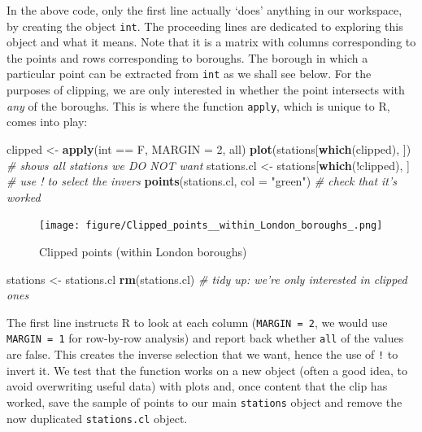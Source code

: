 \documentclass[]{article}
\newenvironment{Shaded}{}{}
\newcommand{\KeywordTok}[1]{\textcolor[rgb]{0.00,0.44,0.13}{\textbf{{#1}}}}
\newcommand{\DataTypeTok}[1]{\textcolor[rgb]{0.56,0.13,0.00}{{#1}}}
\newcommand{\DecValTok}[1]{\textcolor[rgb]{0.25,0.63,0.44}{{#1}}}
\newcommand{\StringTok}[1]{\textcolor[rgb]{0.25,0.44,0.63}{{#1}}}
\newcommand{\CommentTok}[1]{\textcolor[rgb]{0.38,0.63,0.69}{\textit{{#1}}}}
\newcommand{\NormalTok}[1]{{#1}}
\begin{document}
In the above code, only the first line actually `does' anything in our
workspace, by creating the object \texttt{int}. The proceeding lines are
dedicated to exploring this object and what it means. Note that it is a
matrix with columns corresponding to the points and rows corresponding
to boroughs. The borough in which a particular point can be extracted
from \texttt{int} as we shall see below. For the purposes of clipping,
we are only interested in whether the point intersects with \emph{any}
of the boroughs. This is where the function \texttt{apply}, which is
unique to R, comes into play:

\begin{Shaded}
\begin{Highlighting}[]
\NormalTok{clipped <- }\KeywordTok{apply}\NormalTok{(int == F, }\DataTypeTok{MARGIN =} \DecValTok{2}\NormalTok{, all)}
\KeywordTok{plot}\NormalTok{(stations[}\KeywordTok{which}\NormalTok{(clipped), ])  }\CommentTok{# shows all stations we DO NOT want}
\NormalTok{stations.cl <- stations[}\KeywordTok{which}\NormalTok{(!clipped), ]  }\CommentTok{# use ! to select the invers}
\KeywordTok{points}\NormalTok{(stations.cl, }\DataTypeTok{col =} \StringTok{"green"}\NormalTok{)  }\CommentTok{# check that it's worked}
\end{Highlighting}
\end{Shaded}
\begin{figure}[htbp]
\centering
\texttt{[image: figure/Clipped\_points\_\_within\_London\_boroughs\_.png]}
\caption{Clipped points (within London boroughs)}
\end{figure}

\begin{Shaded}
\begin{Highlighting}[]
\NormalTok{stations <- stations.cl}
\KeywordTok{rm}\NormalTok{(stations.cl)  }\CommentTok{# tidy up: we're only interested in clipped ones}
\end{Highlighting}
\end{Shaded}
The first line instructs R to look at each column (\texttt{MARGIN = 2},
we would use \texttt{MARGIN = 1} for row-by-row analysis) and report
back whether \texttt{all} of the values are false. This creates the
inverse selection that we want, hence the use of \texttt{!} to invert
it. We test that the function works on a new object (often a good idea,
to avoid overwriting useful data) with plots and, once content that the
clip has worked, save the sample of points to our main \texttt{stations}
object and remove the now duplicated \texttt{stations.cl} object.
\end{document}
